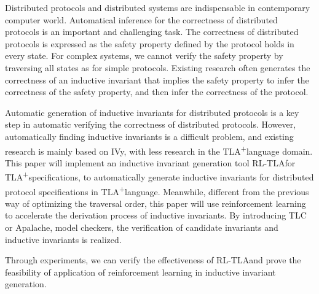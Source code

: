 \documentclass[
    type = bachelor,
    degree = academic,
    twoside,
    fontset = win
]
{njuthesis}
\newcommand{\TLA}{TLA\textsuperscript{+}}
\newcommand{\rltla}{RL-TLA}
\begin{document}
\begin{abstract*}
    Distributed protocols and distributed systems are indispensable in contemporary computer world. Automatical inference for the correctness of distributed protocols is an important and challenging task.
    The correctness of distributed protocols is expressed as the safety property defined by the protocol holds in every state.
    For complex systems, we cannot verify the safety property by traversing all states as for simple protocols.
    Existing research often generates the correctness of an inductive invariant that implies the safety property to infer the correctness of the safety property, and then infer the correctness of the protocol.
    
    Automatic generation of inductive invariants for distributed protocols is a key step in automatic verifying the correctness of distributed protocols.
    However, automatically finding inductive invariants is a difficult problem, and existing research is mainly based on IVy, with less research in the \TLA language domain.
    This paper will implement an inductive invariant generation tool \rltla for \TLA specifications, to automatically generate inductive invariants for distributed protocol specifications in \TLA language.
    Meanwhile, different from the previous way of optimizing the traversal order, this paper will use reinforcement learning to accelerate the derivation process of inductive invariants.
    By introducing TLC or Apalache, model checkers, the verification of candidate invariants and inductive invariants is realized.

    Through experiments, we can verify the effectiveness of \rltla and prove the feasibility of application of reinforcement learning in inductive invariant generation.

\end{abstract*}

\tableofcontents

\mainmatter












\printbibliography
\end{document}
